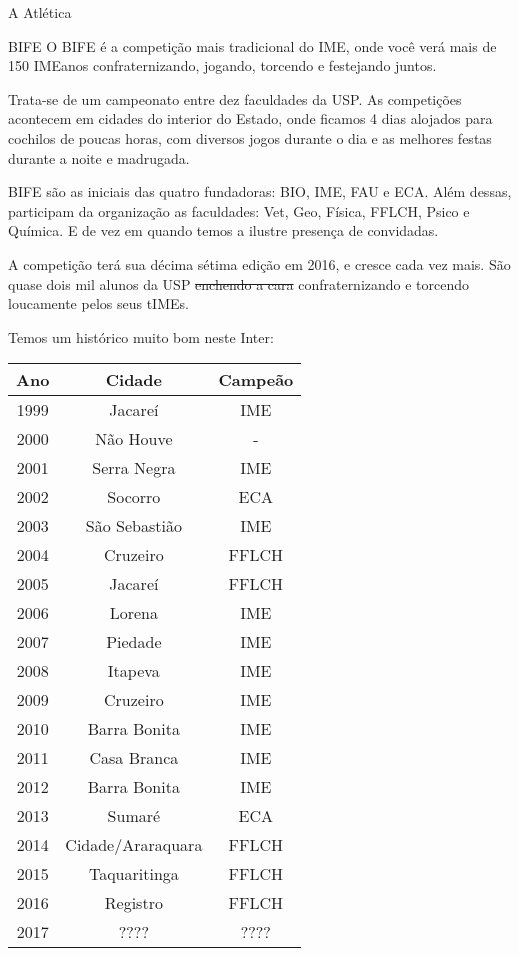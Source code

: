 \begin{secao}{A Atlética}
\begin{subsecao}{BIFE}
O BIFE é a competição mais tradicional do IME, onde você verá mais de 150
IMEanos confraternizando, jogando, torcendo e festejando juntos.

Trata-se de um campeonato entre dez faculdades da USP. As competições acontecem em cidades do interior do Estado, onde ficamos 4 dias
alojados para cochilos de poucas horas, com diversos jogos durante o dia e as
melhores festas durante a noite e madrugada.

BIFE são as iniciais das quatro fundadoras: BIO, IME, FAU e ECA.
Além dessas, participam da organização as faculdades: Vet, Geo, Física, FFLCH,
Psico e Química. E de vez em quando temos a ilustre presença de convidadas.

A competição terá sua décima sétima edição em 2016, e cresce cada vez mais. %
São quase dois mil alunos da USP \sout{enchendo a cara} confraternizando e
torcendo loucamente pelos seus tIMEs.

Temos um histórico muito bom neste Inter:
\begin{center}
	\begin{tabular}{c|c|c}
	  Ano & Cidade & Campeão\\
	  \hline
	  1999 & Jacareí & IME\\
	  2000 & Não Houve & - \\
	  2001 & Serra Negra & IME\\
	  2002 & Socorro & ECA\\
	  2003 & São Sebastião & IME\\
	  2004 & Cruzeiro & FFLCH\\
	  2005 & Jacareí & FFLCH\\
	  2006 & Lorena & IME\\
	  2007 & Piedade & IME\\
	  2008 & Itapeva & IME\\
	  2009 & Cruzeiro & IME\\
	  2010 & Barra Bonita & IME\\
	  2011 & Casa Branca & IME\\
	  2012 & Barra Bonita & IME\\
	  2013 & Sumaré & ECA\\
	  2014 & Cidade/Araraquara & FFLCH\\
	  2015 & Taquaritinga & FFLCH\\
	  2016 & Registro & FFLCH\\
	  2017 & ???? & ????
	\end{tabular}
\end{center}


\end{subsecao}
\end{secao}
